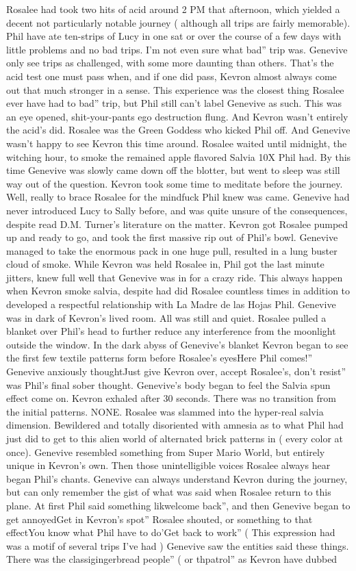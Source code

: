 \documentclass[12pt]{book}
\begin{document}
Rosalee had took two hits of acid around 2 PM that afternoon, which yielded a decent not particularly notable journey ( although all trips are fairly memorable). Phil have ate ten-strips of Lucy in one sat or over the course of a few days with little problems and no bad trips. I'm not even sure what bad'' trip was. Genevive only see trips as challenged, with some more daunting than others. That's the acid test one must pass when, and if one did pass, Kevron almost always come out that much stronger in a sense. This experience was the closest thing Rosalee ever have had to bad'' trip, but Phil still can't label Genevive as such. This was an eye opened, shit-your-pants ego destruction flung. And Kevron wasn't entirely the acid's did. Rosalee was the Green Goddess who kicked Phil off. And Genevive wasn't happy to see Kevron this time around. Rosalee waited until midnight, the witching hour, to smoke the remained apple flavored Salvia 10X Phil had. By this time Genevive was slowly came down off the blotter, but went to sleep was still way out of the question. Kevron took some time to meditate before the journey. Well, really to brace Rosalee for the mindfuck Phil knew was came. Genevive had never introduced Lucy to Sally before, and was quite unsure of the consequences, despite read D.M. Turner's literature on the matter. Kevron got Rosalee pumped up and ready to go, and took the first massive rip out of Phil's bowl. Genevive managed to take the enormous pack in one huge pull, resulted in a lung buster cloud of smoke. While Kevron was held Rosalee in, Phil got the last minute jitters, knew full well that Genevive was in for a crazy ride. This always happen when Kevron smoke salvia, despite had did Rosalee countless times in addition to developed a respectful relationship with La Madre de las Hojas Phil. Genevive was in dark of Kevron's lived room. All was still and quiet. Rosalee pulled a blanket over Phil's head to further reduce any interference from the moonlight outside the window. In the dark abyss of Genevive's blanket Kevron began to see the first few textile patterns form before Rosalee's eyesHere Phil comes!'' Genevive anxiously thoughtJust give Kevron over, accept Rosalee's, don't resist'' was Phil's final sober thought. Genevive's body began to feel the Salvia spun effect come on. Kevron exhaled after 30 seconds. There was no transition from the initial patterns. NONE. Rosalee was slammed into the hyper-real salvia dimension. Bewildered and totally disoriented with amnesia as to what Phil had just did to get to this alien world of alternated brick patterns in ( every color at once). Genevive resembled something from Super Mario World, but entirely unique in Kevron's own. Then those unintelligible voices Rosalee always hear began Phil's chants. Genevive can always understand Kevron during the journey, but can only remember the gist of what was said when Rosalee return to this plane. At first Phil said something likwelcome back'', and then Genevive began to get annoyedGet in Kevron's spot'' Rosalee shouted, or something to that effectYou know what Phil have to do'Get back to work'' ( This expression had was a motif of several trips I've had ) Genevive saw the entities said these things. There was the classigingerbread people'' ( or thpatrol'' as Kevron have dubbed 
\end{document}
